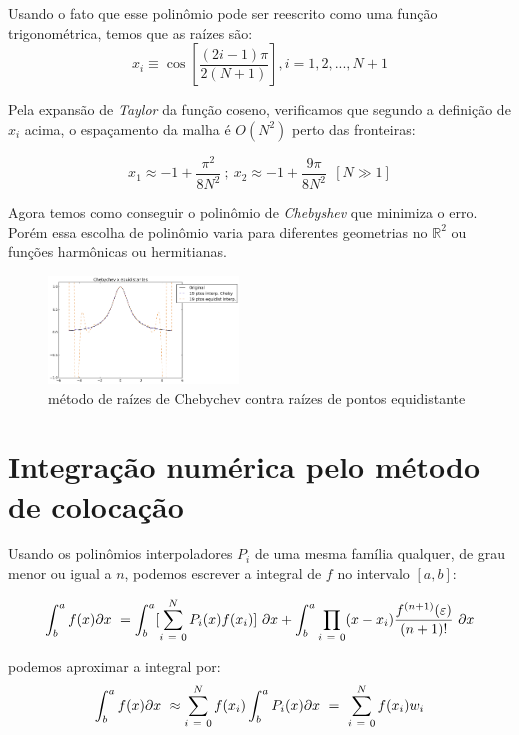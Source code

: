  Usando o fato que esse polinômio pode ser reescrito como uma função trigonométrica, temos que as raízes são:
 \begin{equation}
  x_i  \equiv \cos \left [ \frac{(2i - 1)\pi}{2(N+1)}  \right ] , i = 1,2,..., N+1
 \end{equation}
 
 Pela expansão de \emph{Taylor} da função coseno, verificamos que segundo   a definição de $x_i$ acima, o espaçamento da malha é $O(N^2)$ perto das fronteiras:
 
 \begin{equation}
  x_1 \approx -1 + \frac{\pi^2}{8N^2}\ ;\ x_2 \approx -1 + \frac{9\pi}{8N^2}\ \ [N\gg 1]
 \end{equation}
 
 Agora temos como conseguir o polinômio de \emph{Chebyshev} que minimiza o erro. Porém essa escolha de polinômio varia para diferentes geometrias no $\mathbb{R}^2$ ou funções harmônicas ou hermitianas.
 \begin{figure}[t]
 \includegraphics[width=0.45\textwidth, center]{figuras/chebychev_equidist.png}
 \caption{método de raízes de Chebychev contra raízes de pontos equidistante}
 \end{figure}
\pagebreak
\section{Integração numérica pelo método de colocação }
 Usando os polinômios interpoladores $P_i$ de uma mesma família qualquer,  de grau menor ou igual a $n$, podemos escrever a integral de $f$ no intervalo $[a,b]$:
 
\begin{equation}
\int^{a}_b f(x) \partial x\ = \int^{a}_b[\sum_{i\ =\ 0}^N P_i(x) f(x_i)]\ \partial x +  \int^{a}_b \prod_{i\ =\ 0} (x - x_i)\frac{f^{(n+1)}(\varepsilon)}{(n+1)!}\ \partial x\\
\end{equation}

podemos aproximar a integral por:
\begin{equation}\label{eq:integra}
   \int^{a}_b f(x) \partial x\ \approx \sum_{i\ =\ 0}^N f(x_i) \int^{a}_b P_i(x) \partial x\ =\ \sum_{i\ =\ 0}^N f(x_i) w_i \\
\end{equation}

